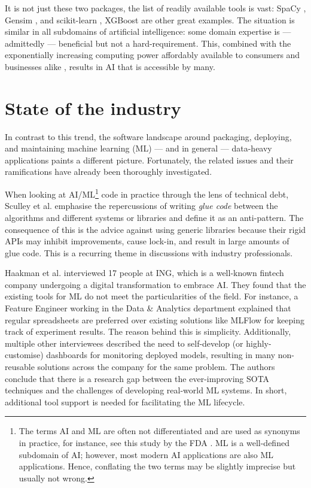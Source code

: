It is not just these two packages, the list of readily available tools is vast: SpaCy \cite{srinivasa2018natural}, Gensim \cite{vrehuuvrek2011gensim}, and scikit-learn \cite{pedregosa2011scikit}, XGBoost \cite{Chen_2016} are other great examples. The situation is similar in all subdomains of artificial intelligence: some domain expertise is --- admittedly --- beneficial but not a hard-requirement. This, combined with the exponentially increasing computing power affordably available to consumers and businesses alike \cite{sun2019summarizing}, results in AI that is accessible by many.

\section{State of the industry} \label{section:industry}

In contrast to this trend, the software landscape around packaging, deploying, and maintaining machine learning (ML) --- and in general --- data-heavy applications paints a different picture. Fortunately, the related issues and their ramifications have already been thoroughly investigated.

When looking at AI/ML\footnote{The terms AI and ML are often not differentiated and are used as synonyms in practice, for instance, see this study by the FDA \cite{food2019proposed}. ML is a well-defined subdomain of AI; however, most modern AI applications are also ML applications. Hence, conflating the two terms may be slightly imprecise but usually not wrong.} code in practice through the lens of technical debt, Sculley et al. \cite{sculley2015hidden} emphasise the repercussions of writing \textit{glue code} between the algorithms and different systems or libraries and define it as an anti-pattern. The consequence of this is the advice against using generic libraries because their rigid APIs may inhibit improvements, cause lock-in, and result in large amounts of glue code. This is a recurring theme in discussions with industry professionals.

Haakman et al. \cite{haakman2021ai} interviewed 17 people at ING, which is a well-known fintech company undergoing a digital transformation to embrace AI. They found that the existing tools for ML do not meet the particularities of the field. For instance, a Feature Engineer working in the Data \& Analytics department explained that regular spreadsheets are preferred over existing solutions like MLFlow for keeping track of experiment results. The reason behind this is simplicity. Additionally, multiple other interviewees described the need to self-develop (or highly-customise) dashboards for monitoring deployed models, resulting in many non-reusable solutions across the company for the same problem. The authors conclude that there is a research gap between the ever-improving SOTA techniques and the challenges of developing real-world ML systems. In short, additional tool support is needed for facilitating the ML lifecycle.

